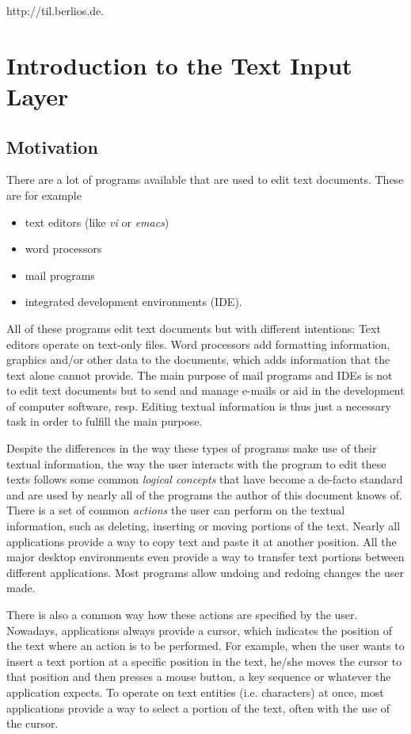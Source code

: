 \documentclass[a4paper]{article}
\def\tilurl{http://til.berlios.de}
\begin{document}
\tilurl.

\section{Introduction to the Text Input Layer}

\subsection{Motivation}

There are a lot of programs available that are used to edit text documents. These are for example
\begin{itemize}
\item text editors (like \emph{vi} or \emph{emacs})
\item word processors
\item mail programs
\item integrated development environments (IDE).
\end{itemize}

All of these programs edit text documents but with different intentions: Text editors operate on text-only files. Word processors add formatting information, graphics and/or other data to the documents, which adds information that the text alone cannot provide. The main purpose of mail programs and IDEs is not to edit text documents but to send and manage e-mails or aid in the development of computer software, resp. Editing textual information is thus just a necessary task in order to fulfill the main purpose.

Despite the differences in the way these types of programs make use of their textual information, the way the user interacts with the program to edit these texts follows some common \emph{logical concepts} that have become a de-facto standard and are used by nearly all of the programs the author of this document knows of. There is a set of common \emph{actions} the user can perform on the textual information, such as deleting, inserting or moving portions of the text. Nearly all applications provide a way to copy text and paste it at another position. All the major desktop environments even provide a way to transfer text portions between different applications. Most programs allow undoing and redoing changes the user made.

There is also a common way how these actions are specified by the user. Nowadays, applications always provide a cursor, which indicates the position of the text where an action is to be performed. For example, when the user wants to insert a text portion at a specific position in the text, he/she moves the cursor to that position and then presses a mouse button, a key sequence or whatever the application expects. To operate on text entities (i.e. characters) at once, most applications provide a way to select a portion of the text, often with the use of the cursor.
\end{document}
